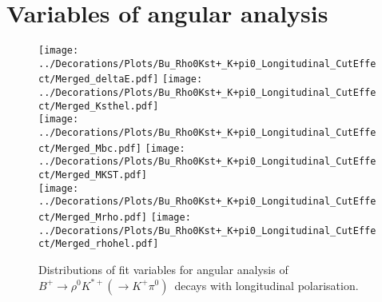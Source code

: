 \section{Variables of angular analysis}
\label{sec:Vars}
\begin{figure}[p]
\centering
\texttt{[image: ../Decorations/Plots/Bu\_Rho0Kst+\_K+pi0\_Longitudinal\_CutEffect/Merged\_deltaE.pdf]}\hfil
\texttt{[image: ../Decorations/Plots/Bu\_Rho0Kst+\_K+pi0\_Longitudinal\_CutEffect/Merged\_Ksthel.pdf]}\\
\texttt{[image: ../Decorations/Plots/Bu\_Rho0Kst+\_K+pi0\_Longitudinal\_CutEffect/Merged\_Mbc.pdf]}\hfil
\texttt{[image: ../Decorations/Plots/Bu\_Rho0Kst+\_K+pi0\_Longitudinal\_CutEffect/Merged\_MKST.pdf]}\\
\texttt{[image: ../Decorations/Plots/Bu\_Rho0Kst+\_K+pi0\_Longitudinal\_CutEffect/Merged\_Mrho.pdf]}\hfil
\texttt{[image: ../Decorations/Plots/Bu\_Rho0Kst+\_K+pi0\_Longitudinal\_CutEffect/Merged\_rhohel.pdf]}\\
\caption{Distributions of fit variables for angular analysis of $B^+\to\rho^0K^{*+}(\to K^+\pi^0)$\ decays with longitudinal polarisation.}
\end{figure}
\clearpage

